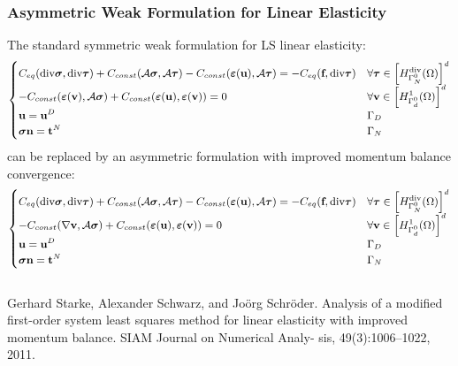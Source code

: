 \documentclass[8pt, oneside]{beamer}   	%
\newcommand{\bff}{\textbf{f}}
\newcommand{\bn}{\textbf{n}}
\newcommand{\btau}{\boldsymbol{\tau}}
\newcommand{\bt}{\textbf{t}}
\newcommand{\bv}{\textbf{v}}
\newcommand{\bu}{\textbf{u}}
\newcommand{\bsigma}{\boldsymbol{\sigma}}
\begin{document}
\begin{frame}
\Huge {}
\end{frame}












\begin{frame}
\frametitle{\textbf{Asymmetric Weak Formulation for Linear Elasticity}}
The standard symmetric weak formulation for LS linear elasticity:
\begin{align*}
\small
 \begin{cases}
C_{eq}(\text{div} \bsigma , \text{div} \btau) + C_{const} (\mathcal{A} \bsigma,\mathcal{A} \btau) - C_{const}(\boldsymbol{\varepsilon}(\bu),\mathcal{A} \btau)=-C_{eq}(\bff , \text{div} \btau) & \forall \btau \in \left[ H_{\Gamma_N^0}^{\text{div}}(\Omega) \right]^d \\
- C_{const}(\boldsymbol{\varepsilon}(\bv),\mathcal{A} \bsigma)+
C_{const}(\boldsymbol{\varepsilon}(\bu),\boldsymbol{\varepsilon}(\bv))=0 & \forall \bv \in \left[H_{\Gamma_{d}^0}^1(\Omega) \right]^d\\
\bu = \bu^D & \Gamma_D\\
\bsigma  \bn = \bt^N & \Gamma_N\\
 \end{cases}
\end{align*}
can be replaced by an asymmetric formulation with improved momentum balance convergence:
\begin{align*}
\small
 \begin{cases}
C_{eq}(\text{div} \bsigma , \text{div} \btau) + C_{const} (\mathcal{A} \bsigma,\mathcal{A} \btau) - C_{const}(\boldsymbol{\varepsilon}(\bu),\mathcal{A} \btau)=-C_{eq}(\bff , \text{div} \btau) & \forall \btau \in \left[ H_{\Gamma_N^0}^{\text{div}}(\Omega) \right]^d \\
- C_{const}(\nabla \bv,\mathcal{A} \bsigma)+
C_{const}(\boldsymbol{\varepsilon}(\bu),\boldsymbol{\varepsilon}(\bv))=0 & \forall \bv \in \left[H_{\Gamma_{d}^0}^1(\Omega) \right]^d\\
\bu = \bu^D & \Gamma_D\\
\bsigma  \bn = \bt^N & \Gamma_N\\
 \end{cases}
\end{align*}
${}$\\
\footnotesize{Gerhard Starke, Alexander Schwarz, and Jo\"{o}rg Schr\"{o}der. Analysis of a modified first-order system least squares method for linear elasticity with improved momentum balance. SIAM Journal on Numerical Analy- sis, 49(3):1006–1022, 2011.}
\end{frame}
\end{document}
